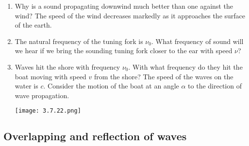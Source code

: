 \documentclass{article}
\begin{document}
\begin{enumerate}[label=3.7.\arabic*]
\item Why is a sound propagating downwind much better than one against the wind? The speed of the wind decreases markedly as it approaches the surface of the earth.


\item The natural frequency of the tuning fork is $\nu_0$. What frequency of sound will we hear if we bring the sounding tuning fork closer to the ear with speed $\nu$?

\item Waves hit the shore with frequency $\nu_0$. With what frequency do they hit the boat moving with speed $v$ from the shore? The speed of the waves on the water is $c$. Consider the motion of the boat at an angle $\alpha$ to the direction of wave propagation.


\begin{center}
    \texttt{[image: 3.7.22.png]}
\end{center}


\end{enumerate}


\subsection{Overlapping and reflection of waves}
\end{document}
